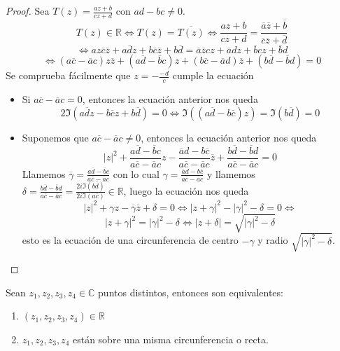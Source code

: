 \begin{proof}
    Sea $T(z) = \frac{az + b}{cz + d}$ con $ad - bc \neq 0$. 
    \[
        T(z) \in \mathbb{R} \iff T(z) = \overline{T(z)} \iff \frac{az + b}{cz + d} = \frac{\overline{a}\overline{z} + \overline{b}}{\overline{c}\overline{z} + \overline{d}} 
    \]
    \[
        \iff az\overline{c}\overline{z} + a\overline{d}z + b\overline{c}\overline{z} + b\overline{d} = \overline{a}\overline{z}cz + \overline{a}dz + \overline{b}cz + \overline{b}d
    \]
    \[
        \iff (a\overline{c} - \overline{a}c)z\overline{z} + (a\overline{d} - \overline{b}c)z + (b\overline{c} - \overline{a}d)\overline{z} + (b\overline{d} - \overline{b}d) = 0
    \]
    Se comprueba fácilmente que $z=-\frac{-d}{c}$ cumple la ecuación
    \begin{itemize}
        \item Si $a\overline{c} - \overline{a}c = 0$, entonces la ecuación anterior nos queda
        \[
            2 \Im(a\overline{d}z - b\overline{c}z + b\overline{d}) = 0 \iff \Im((a\overline{d} - b\overline{c})z) = \Im(b\overline{d}) = 0
        \]
        \item Suponemos que $a\overline{c} - \overline{a}c \neq 0$, entonces la ecuación anterior nos queda
        \[
            |z|^2+\frac{a\overline{d} - \overline{b}c}{a\overline{c} - \overline{a}c}z - \frac{\overline{a}d - b\overline{c}}{a\overline{c} - \overline{a}c}\overline{z} + \frac{b\overline{d} - \overline{b}d}{a\overline{c} - \overline{a}c} = 0
        \]
        Llamemos $\overline{\gamma}= \frac{a\overline{d} - \overline{b}c}{a\overline{c} - \overline{a}c}$ con lo cual $\gamma = \frac{\overline{a}d - b\overline{c}}{a\overline{c} - \overline{a}c}$
        y llamemos $\delta = \frac{b\overline{d} - \overline{b}d}{a\overline{c} - \overline{a}c} = \frac{2i \Im(b\overline{d})}{2i \Im(a\overline{c})} \in \mathbb{R}$, luego la ecuación nos queda
        \[
            |z|^2 + \gamma z - \overline{\gamma}\overline{z} + \delta = 0 \iff
            |z+\gamma|^2 - |\gamma|^2 - \delta = 0 \iff
        \]
        \[
            |z + \gamma|^2 = |\gamma|^2 - \delta \iff |z + \delta | = \sqrt{|\gamma|^2 - \delta}
        \]
        esto es la ecuación de una circunferencia de centro $-\gamma$ y radio $\sqrt{|\gamma|^2 - \delta}$.

    \end{itemize}
    
\end{proof}

\begin{proposición}
    Sean $z_1, z_2, z_3, z_4 \in \mathbb{C}$ puntos distintos, entonces son equivalentes:
    \begin{enumerate}
        \item $(z_1, z_2, z_3, z_4) \in \mathbb{R}$
        \item $z_1, z_2, z_3, z_4$ están sobre una misma circunferencia o recta.
    \end{enumerate}
\end{proposición}

